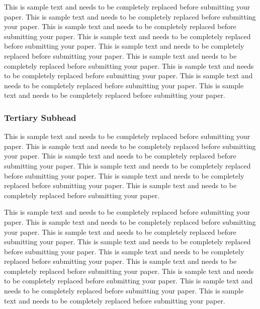 \documentclass[11pt]{asaproc}
\begin{document}
This is sample text and needs to be completely replaced before submitting your paper. This is sample text and needs to be completely replaced before submitting your paper. This is sample text and needs to be completely replaced before submitting your paper. This is sample text and needs to be completely replaced before submitting your paper. This is sample text and needs to be completely replaced before submitting your paper. This is sample text and needs to be completely replaced before submitting your paper. This is sample text and needs to be completely replaced before submitting your paper. This is sample text and needs to be completely replaced before submitting your paper. This is sample text and needs to be completely replaced before submitting your paper. 

\subsubsection{Tertiary Subhead}


This is sample text and needs to be completely replaced before submitting your paper. This is sample text and needs to be completely replaced before submitting your paper. This is sample text and needs to be completely replaced before submitting your paper. This is sample text and needs to be completely replaced before submitting your paper. This is sample text and needs to be completely replaced before submitting your paper. This is sample text and needs to be completely replaced before submitting your paper.

This is sample text and needs to be completely replaced before submitting your paper. This is sample text and needs to be completely replaced before submitting your paper. This is sample text and needs to be completely replaced before submitting your paper. This is sample text and needs to be completely replaced before submitting your paper. This is sample text and needs to be completely replaced before submitting your paper. This is sample text and needs to be completely replaced before submitting your paper. This is sample text and needs to be completely replaced before submitting your paper. This is sample text and needs to be completely replaced before submitting your paper. This is sample text and needs to be completely replaced before submitting your paper. 
\end{document}
